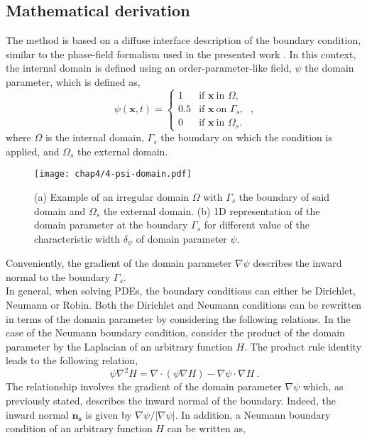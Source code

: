 \subsection{Mathematical derivation}
    The method is based on a diffuse interface description of the boundary condition, similar to the phase-field formalism used in the presented work \cite{YuChenThornton2012}. In this context, the internal domain is defined using an order-parameter-like field, $\psi$ the domain parameter, which is defined as,
    \begin{equation}
        \psi(\mathbf{x}, t) = \begin{cases}
            1 & \text{if } \mathbf{x}\ \text{in } \Omega, \\
            0.5 & \text{if } \mathbf{x}\ \text{on } \Gamma_s, \\
            0 & \text{if } \mathbf{x}\ \text{in } \Omega_s .
        \end{cases}
        \ ,
    \end{equation}
    where $\Omega$ is the internal domain, $\Gamma_s$ the boundary on which the condition is applied, and $\Omega_s$ the external domain.
    \begin{figure}[H]
        \centering
        \texttt{[image: chap4/4-psi-domain.pdf]}
        \caption{(a) Example of an irregular domain $\Omega$ with $\Gamma_s$ the boundary of said domain and $\Omega_s$ the external domain. (b) 1D representation of the domain parameter at the boundary $\Gamma_s$ for different value of the characteristic width $\delta_\psi$ of domain parameter $\psi$.}
        \label{fig:4-sbm-domain-parameter}
    \end{figure}
    Conveniently, the gradient of the domain parameter $\nabla \psi$ describes the inward normal to the boundary $\Gamma_s$.\\
    In general, when solving PDEs, the boundary conditions can either be Dirichlet, Neumann or Robin. Both the Dirichlet and Neumann conditions can be rewritten in terms of the domain parameter by considering the following relations. In the case of the Neumann boundary condition, consider the product of the domain parameter by the Laplacian of an arbitrary function $H$. The product rule identity leads to the following relation,
    \begin{equation}\label{eq:4-sbm-condition}
        \psi \nabla^2 H = \nabla \cdot (\psi \nabla H) - \nabla \psi \cdot \nabla H\ .
    \end{equation}
    The relationship involves the gradient of the domain parameter $\nabla \psi$ which, as previously stated, describes the inward normal of the boundary. Indeed, the inward normal $\mathbf{n_s}$ is given by $\nabla \psi / |\nabla \psi|$. In addition, a Neumann boundary condition of an arbitrary function $H$ can be written as,
